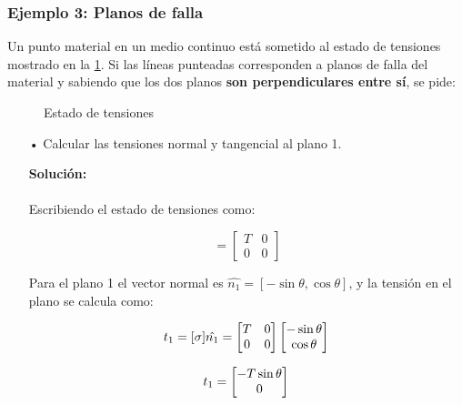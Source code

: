 \documentclass[../notas medios.tex]{subfiles}
\begin{document}
\subsubsection*{Ejemplo 3: Planos de falla}
Un punto material en un medio continuo est\'a sometido al estado de tensiones mostrado en la \cref{punto}. Si las líneas punteadas corresponden a planos de falla del material y sabiendo que los dos planos {\bf son perpendiculares entre sí}, se pide:

\begin{figure}[H]
	\centering
	\caption{Estado de tensiones}
	\label{punto}
\end{figure}



\begin{itemize}

\item[•] Calcular las tensiones normal y tangencial al plano 1.

\textbf{Solución:}\\\\

Escribiendo el estado de tensiones como:

\begin{equation*}
[\sigma]
= 
\begin{bmatrix}
    T & 0 \\
    0 & 0
\end{bmatrix}
\end{equation*}

Para el plano 1 el vector normal es $\hat{n_1}=[ -\sin{\theta}, \cos{\theta} ]$, y la tensi\'on en el plano se calcula como:

\begin{equation*}
t_1 = [\sigma]\hat{n_1}
= 
\begin{bmatrix}
    T & 0 \\
    0 & 0
\end{bmatrix}
\begin{bmatrix}
   -\sin{\theta} \\
    \cos{\theta} \\
\end{bmatrix} \\
\end{equation*}

\begin{equation*}
t_1 = 
\begin{bmatrix}
    -T\sin{\theta} \\
    0 
\end{bmatrix} \\
\end{equation*}


\end{itemize}
\end{document}
